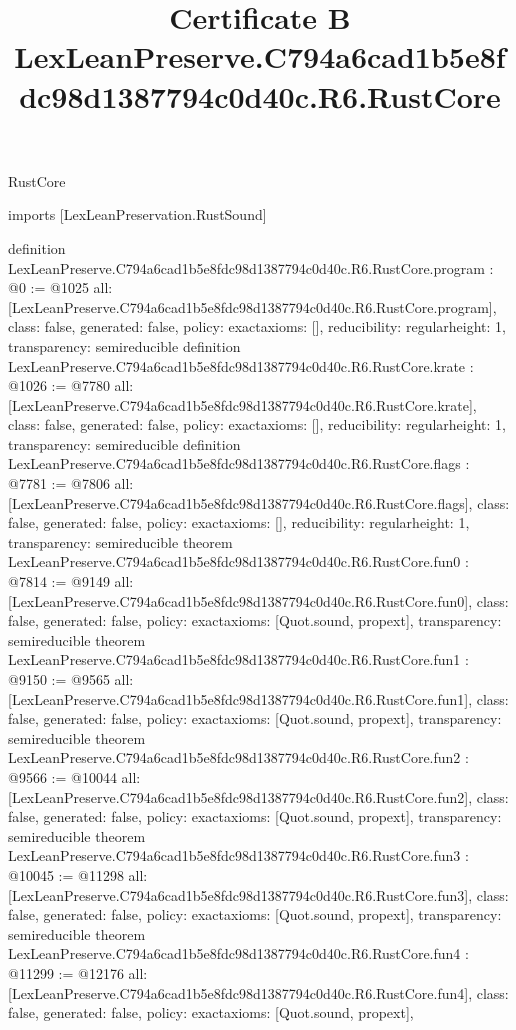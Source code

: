\begin{lexlean}{RustCore}
\title{Certificate B LexLeanPreserve.C794a6cad1b5e8fdc98d1387794c0d40c.R6.RustCore}
\begin{coremodule}
imports [LexLeanPreservation.RustSound]

definition LexLeanPreserve.C794a6cad1b5e8fdc98d1387794c0d40c.R6.RustCore.program : @0 := @1025 {
  all: [LexLeanPreserve.C794a6cad1b5e8fdc98d1387794c0d40c.R6.RustCore.program],
  class: false,
  generated: false,
  policy: exact{axioms: []},
  reducibility: regular{height: 1},
  transparency: semireducible
}
definition LexLeanPreserve.C794a6cad1b5e8fdc98d1387794c0d40c.R6.RustCore.krate : @1026 := @7780 {
  all: [LexLeanPreserve.C794a6cad1b5e8fdc98d1387794c0d40c.R6.RustCore.krate],
  class: false,
  generated: false,
  policy: exact{axioms: []},
  reducibility: regular{height: 1},
  transparency: semireducible
}
definition LexLeanPreserve.C794a6cad1b5e8fdc98d1387794c0d40c.R6.RustCore.flags : @7781 := @7806 {
  all: [LexLeanPreserve.C794a6cad1b5e8fdc98d1387794c0d40c.R6.RustCore.flags],
  class: false,
  generated: false,
  policy: exact{axioms: []},
  reducibility: regular{height: 1},
  transparency: semireducible
}
theorem LexLeanPreserve.C794a6cad1b5e8fdc98d1387794c0d40c.R6.RustCore.fun0 : @7814 := @9149 {
  all: [LexLeanPreserve.C794a6cad1b5e8fdc98d1387794c0d40c.R6.RustCore.fun0],
  class: false,
  generated: false,
  policy: exact{axioms: [Quot.sound, propext]},
  transparency: semireducible
}
theorem LexLeanPreserve.C794a6cad1b5e8fdc98d1387794c0d40c.R6.RustCore.fun1 : @9150 := @9565 {
  all: [LexLeanPreserve.C794a6cad1b5e8fdc98d1387794c0d40c.R6.RustCore.fun1],
  class: false,
  generated: false,
  policy: exact{axioms: [Quot.sound, propext]},
  transparency: semireducible
}
theorem LexLeanPreserve.C794a6cad1b5e8fdc98d1387794c0d40c.R6.RustCore.fun2 : @9566 := @10044 {
  all: [LexLeanPreserve.C794a6cad1b5e8fdc98d1387794c0d40c.R6.RustCore.fun2],
  class: false,
  generated: false,
  policy: exact{axioms: [Quot.sound, propext]},
  transparency: semireducible
}
theorem LexLeanPreserve.C794a6cad1b5e8fdc98d1387794c0d40c.R6.RustCore.fun3 : @10045 := @11298 {
  all: [LexLeanPreserve.C794a6cad1b5e8fdc98d1387794c0d40c.R6.RustCore.fun3],
  class: false,
  generated: false,
  policy: exact{axioms: [Quot.sound, propext]},
  transparency: semireducible
}
theorem LexLeanPreserve.C794a6cad1b5e8fdc98d1387794c0d40c.R6.RustCore.fun4 : @11299 := @12176 {
  all: [LexLeanPreserve.C794a6cad1b5e8fdc98d1387794c0d40c.R6.RustCore.fun4],
  class: false,
  generated: false,
  policy: exact{axioms: [Quot.sound, propext]},
}
\end{coremodule}
\end{lexlean}
